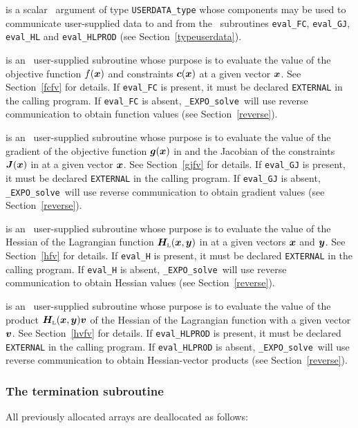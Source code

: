 \documentclass{galahad}
\newcommand{\packagename}{EXPO}
\newcommand{\fullpackagename}{\libraryname\_\packagename}
\newcommand{\solver}{{\tt \fullpackagename\_solve}}
\newcommand{\bmHL}{\bmH\sub{L}}
\begin{document}
\begin{description}
 is a scalar \intentinout\ argument of type
{\tt USERDATA\_type} whose components may be used
to communicate user-supplied data to and from the
\optional\ subroutines
{\tt eval\_FC}, {\tt eval\_GJ},
{\tt eval\_HL} and {\tt eval\_HLPROD}
(see Section~\ref{typeuserdata}).

 is an \optional\
user-supplied subroutine whose purpose is to evaluate the value of the
objective function $f({\bm{x}})$ and constraints ${\bm{c}}({\bm{x}})$ at a given 
vector ${\bm{x}}$. See Section~\ref{fcfv} for details.
If {\tt eval\_FC} is present,
it must be declared {\tt EXTERNAL} in the calling program.
If {\tt eval\_FC} is absent, \solver\ will use reverse communication to
obtain function values (see Section~\ref{reverse}).

 is an \optional\
user-supplied subroutine whose purpose is to evaluate the value of the
gradient of the objective function ${\bm{g}}({\bm{x}})$ in 
and the Jacobian of the constraints ${\bm{J}}({\bm{x}})$ in \req{J}
at a given vector ${\bm{x}}$. See Section~\ref{gjfv} for details.
If {\tt eval\_GJ} is present,
it must be declared {\tt EXTERNAL} in the calling program.
If {\tt eval\_GJ} is absent, \solver\ will use reverse communication to
obtain gradient values (see Section~\ref{reverse}).

 is an \optional\
user-supplied subroutine whose purpose is to evaluate the value of the
Hessian of the Lagrangian function $\bmHL(\bmx,\bmy)$ in 
at a given vectors ${\bm{x}}$ and ${\bm{y}}$. See Section~\ref{hfv} for details.
If {\tt eval\_H} is present,
it must be declared {\tt EXTERNAL} in the calling program.
If {\tt eval\_H} is absent, \solver\ will use reverse communication to
obtain Hessian values (see Section~\ref{reverse}).

\itt{eval\_HLPROD} is an \optional\
user-supplied subroutine whose purpose is to evaluate the value of the
product $\bmHL(\bmx,\bmy) \bmv$ of the Hessian of the Lagrangian function
 with a given vector ${\bm{v}}$. See Section~\ref{hvfv} for details.
If {\tt eval\_HLPROD} is present,
it must be declared {\tt EXTERNAL} in the calling program.
If {\tt eval\_HLPROD} is absent, \solver\ will use reverse communication to
obtain Hessian-vector products (see Section~\ref{reverse}).

\end{description}


\subsubsection{The  termination subroutine}
All previously allocated arrays are deallocated as follows:
\vspace*{1mm}
\end{document}

